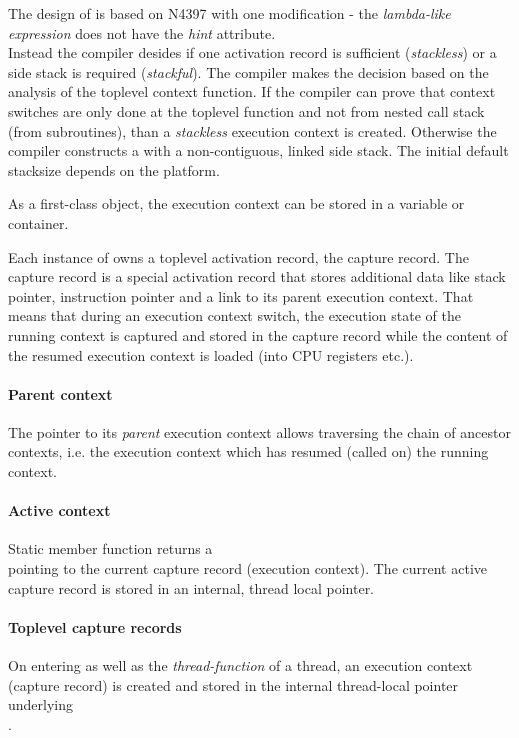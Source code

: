 \newpage
{}
The design of \ectx is based on N4397\cite{N4397} with one modification - the
\emph{lambda-like expression} does not have the \emph{hint} attribute.\\
Instead the compiler desides if one activation record is sufficient
(\emph{stackless}) or a side stack is required (\emph{stackful}). The compiler 
makes the decision based on the analysis of the toplevel context function.
If the compiler can prove that context switches are only done at the toplevel
function and not from nested call stack (from subroutines), than a
\emph{stackless} execution context is created. Otherwise the compiler constructs
a \ectx with a non-contiguous, linked side stack. The initial default stacksize
depends on the platform.

As a first-class object, the execution context can be stored in a variable or
container.

Each instance of \ectx owns a toplevel activation record, the capture record.
The capture record is a special activation record that stores additional data
like stack pointer, instruction pointer and a link to its parent execution
context. That means that during an execution context switch, the execution state
of the running context is captured and stored in the capture record while the
content of the resumed execution context is loaded (into CPU registers etc.).

\paragraph*{Parent context}
The pointer to its \emph{parent} execution context allows traversing the chain
of ancestor contexts, i.e. the execution context which has resumed (called \ectxop
on) the running context.

\paragraph*{Active context}
Static member function \ectxcurrent returns a\\
\ectx pointing to the current capture record (execution context). The
current active capture record is stored in an internal, thread local pointer.

\paragraph*{Toplevel capture records}
On entering \main as well as the \emph{thread-function} of a thread, an execution
context (capture record) is created and stored in the internal thread-local
pointer underlying\\\ectxcurrent.

